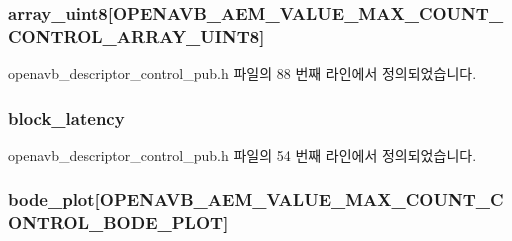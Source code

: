 \subsubsection[{\texorpdfstring{array\+\_\+uint8}{array_uint8}}]{ array\+\_\+uint8\mbox{[}{\bf O\+P\+E\+N\+A\+V\+B\+\_\+\+A\+E\+M\+\_\+\+V\+A\+L\+U\+E\+\_\+\+M\+A\+X\+\_\+\+C\+O\+U\+N\+T\+\_\+\+C\+O\+N\+T\+R\+O\+L\+\_\+\+A\+R\+R\+A\+Y\+\_\+\+U\+I\+N\+T8}\mbox{]}}\hypertarget{structopenavb__aem__descriptor__control__t_a636afa37e18cf00ab648b5584a69fb72}{}\label{structopenavb__aem__descriptor__control__t_a636afa37e18cf00ab648b5584a69fb72}


openavb\+\_\+descriptor\+\_\+control\+\_\+pub.\+h 파일의 88 번째 라인에서 정의되었습니다.

\subsubsection[{\texorpdfstring{block\+\_\+latency}{block_latency}}]{ block\+\_\+latency}\hypertarget{structopenavb__aem__descriptor__control__t_ac8dd29fd39cc138a898f39f7baa876ae}{}\label{structopenavb__aem__descriptor__control__t_ac8dd29fd39cc138a898f39f7baa876ae}


openavb\+\_\+descriptor\+\_\+control\+\_\+pub.\+h 파일의 54 번째 라인에서 정의되었습니다.

\subsubsection[{\texorpdfstring{bode\+\_\+plot}{bode_plot}}]{ bode\+\_\+plot\mbox{[}{\bf O\+P\+E\+N\+A\+V\+B\+\_\+\+A\+E\+M\+\_\+\+V\+A\+L\+U\+E\+\_\+\+M\+A\+X\+\_\+\+C\+O\+U\+N\+T\+\_\+\+C\+O\+N\+T\+R\+O\+L\+\_\+\+B\+O\+D\+E\+\_\+\+P\+L\+OT}\mbox{]}}\hypertarget{structopenavb__aem__descriptor__control__t_a1c0c8eff5115d465db8578e4c2ca76ea}{}\label{structopenavb__aem__descriptor__control__t_a1c0c8eff5115d465db8578e4c2ca76ea}


